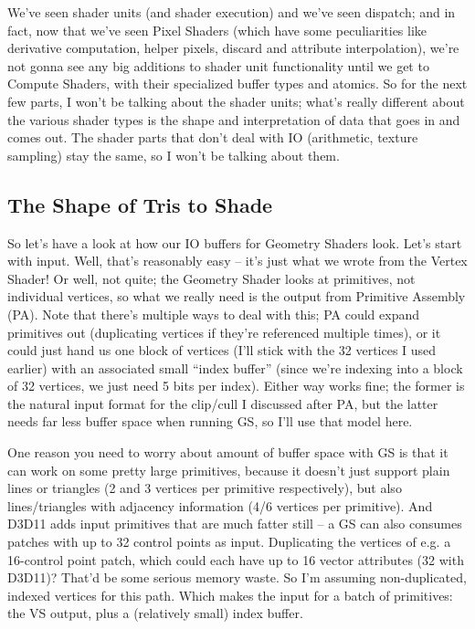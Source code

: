 \documentclass[12pt]{article}
\begin{document}
We’ve seen shader units (and shader execution) and we’ve seen dispatch; and in fact, now that we’ve seen Pixel Shaders (which have some peculiarities like derivative computation, helper pixels, discard and attribute interpolation), we’re not gonna see any big additions to shader unit functionality until we get to Compute Shaders, with their specialized buffer types and atomics. So for the next few parts, I won’t be talking about the shader units; what’s really different about the various shader types is the shape and interpretation of data that goes in and comes out. The shader parts that don’t deal with IO (arithmetic, texture sampling) stay the same, so I won’t be talking about them.

\subsection{The Shape of Tris to Shade}
\label{sec:org9ee80a4}

So let’s have a look at how our IO buffers for Geometry Shaders look. Let’s start with input. Well, that’s reasonably easy – it’s just what we wrote from the Vertex Shader! Or well, not quite; the Geometry Shader looks at primitives, not individual vertices, so what we really need is the output from Primitive Assembly (PA). Note that there’s multiple ways to deal with this; PA could expand primitives out (duplicating vertices if they’re referenced multiple times), or it could just hand us one block of vertices (I’ll stick with the 32 vertices I used earlier) with an associated small “index buffer” (since we’re indexing into a block of 32 vertices, we just need 5 bits per index). Either way works fine; the former is the natural input format for the clip/cull I discussed after PA, but the latter needs far less buffer space when running GS, so I’ll use that model here.

One reason you need to worry about amount of buffer space with GS is that it can work on some pretty large primitives, because it doesn’t just support plain lines or triangles (2 and 3 vertices per primitive respectively), but also lines/triangles with adjacency information (4/6 vertices per primitive). And D3D11 adds input primitives that are much fatter still – a GS can also consumes patches with up to 32 control points as input. Duplicating the vertices of e.g. a 16-control point patch, which could each have up to 16 vector attributes (32 with D3D11)? That’d be some serious memory waste. So I’m assuming non-duplicated, indexed vertices for this path. Which makes the input for a batch of primitives: the VS output, plus a (relatively small) index buffer.
\end{document}
